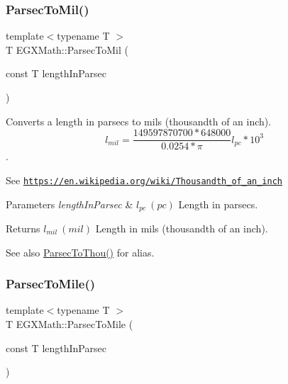 \subsubsection{\texorpdfstring{Parsec\+To\+Mil()}{ParsecToMil()}}
{\footnotesize\ttfamily template$<$typename T $>$ \\
T E\+G\+X\+Math\+::\+Parsec\+To\+Mil (\begin{DoxyParamCaption}\item[{const T}]{length\+In\+Parsec }\end{DoxyParamCaption})}



Converts a length in parsecs to mils (thousandth of an inch). \[ l_{mil}= \frac{149597870700 * 648000}{0.0254 * \pi} l_{pc} * 10^{3} \]. 

See \href{https://en.wikipedia.org/wiki/Thousandth_of_an_inch}{\tt https\+://en.\+wikipedia.\+org/wiki/\+Thousandth\+\_\+of\+\_\+an\+\_\+inch} 
\begin{DoxyParams}{Parameters}
{\em length\+In\+Parsec} & $ l_{pc}\ (pc)$ Length in parsecs. \\
\hline
\end{DoxyParams}
\begin{DoxyReturn}{Returns}
$ l_{mil}\ (mil)$ Length in mils (thousandth of an inch). 
\end{DoxyReturn}
\begin{DoxySeeAlso}{See also}
\mbox{\hyperlink{group___e_g_x_math-_conversions-_length_conversions-_astronomical-_parsec-_imperial_ga0e473cc0d93ca332b9fc42ed6f8d73c6}{Parsec\+To\+Thou()}} for alias. 
\end{DoxySeeAlso}
\mbox{\label{group___e_g_x_math-_conversions-_length_conversions-_astronomical-_parsec-_imperial_gaff2c298a0830dd20dc3acce2d9d789f8}} 
\subsubsection{\texorpdfstring{Parsec\+To\+Mile()}{ParsecToMile()}}
{\footnotesize\ttfamily template$<$typename T $>$ \\
T E\+G\+X\+Math\+::\+Parsec\+To\+Mile (\begin{DoxyParamCaption}\item[{const T}]{length\+In\+Parsec }\end{DoxyParamCaption})}



